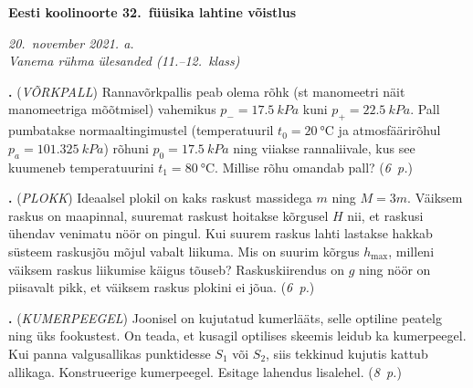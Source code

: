 \documentclass[11pt,a5paper]{article}
\newcommand{\numb}[1]{\vspace{5pt}\textbf{\large #1}}
\newcommand{\nimi}[1]{(\textsl{\small #1})}
\newcommand{\punktid}[1]{(\emph{#1~p.})}
\newcounter{ylesanne}
\newcommand{\yl}[1]{\addtocounter{ylesanne}{1}\numb{\theylesanne.} \nimi{#1} \newblock{}}
\newcommand{\autor}[1]{}%
\begin{document}
\begin{center}
  \textbf{\Large Eesti koolinoorte 32.\ füüsika lahtine võistlus} \par
  \emph{20.\ november 2021. a.\\Vanema rühma ülesanded (11.--12.\ klass)}
\end{center}

 \par

\yl{VÕRKPALL}
Rannavõrkpallis peab olema rõhk (st manomeetri näit manomeetriga mõõtmisel) vahemikus $p_-=\SI{17.5}{kPa}$ kuni $p_+=\SI{22.5}{kPa}$. Pall pumbatakse normaaltingimustel (temperatuuril $t_0=\SI{20}{\celsius}$ ja atmosfäärirõhul $p_a=\SI{101.325}{kPa}$) rõhuni $p_0=\SI{17.5}{kPa}$ ning viiakse rannaliivale, kus see kuumeneb temperatuurini $t_1=\SI{80}{\celsius}$. Millise rõhu omandab pall?
\punktid{6} \autor{Jaan Kalda}

\yl{PLOKK}
Ideaalsel plokil on kaks raskust massidega $m$ ning $M=3m$. Väiksem raskus on maapinnal, suuremat raskust hoitakse kõrgusel $H$ nii, et raskusi ühendav venimatu nöör on pingul. Kui suurem raskus lahti lastakse hakkab süsteem raskusjõu mõjul vabalt liikuma. Mis on suurim kõrgus $h_\text{max}$, milleni väiksem raskus liikumise käigus tõuseb? Raskuskiirendus on $g$ ning nöör on piisavalt pikk, et väiksem raskus plokini ei jõua.
\punktid{6} \autor{Eero Vaher}

\yl{KUMERPEEGEL}
Joonisel on kujutatud kumerlääts, selle optiline peatelg ning üks fookustest. On teada, et kusagil optilises skeemis leidub ka kumerpeegel. Kui panna valgusallikas punktidesse $S_1$ või $S_2$, siis tekkinud kujutis kattub allikaga. Konstrueerige kumerpeegel. Esitage lahendus lisalehel.
\punktid{8} \autor{Konstantin Dukatš}
\begin{figure}[h]
  \vspace{-1em}
  \centering
  \vspace{-1em}
\end{figure}
\end{document}

